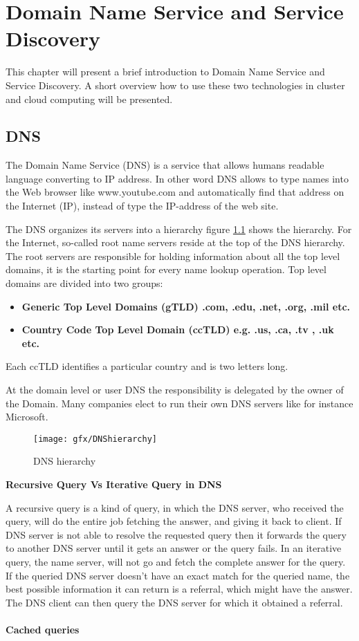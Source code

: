 \chapter{Domain Name Service and Service Discovery}\label{ch:dns}
This chapter will present a brief introduction to Domain Name Service and Service Discovery. A short overview how to use these two technologies in cluster and cloud computing will be presented.
	
\section{DNS}
The Domain Name Service (DNS) is a service that allows humans readable language converting to IP address. In other word DNS allows to type names into the Web browser like www.youtube.com and automatically find that address on the Internet (IP), instead of type the IP-address of the web site.

The DNS organizes its servers into a hierarchy figure \ref{fig:DNShierarchy} shows the hierarchy. For the Internet, so-called root name servers reside at the top of the DNS hierarchy. The root servers are responsible for holding information about all the top level domains, it is the starting point for every name lookup operation. Top level domains are divided into two groups:

\begin{itemize}
	\item \textbf{Generic Top Level Domains (gTLD) .com, .edu, .net, .org, .mil etc.}
	\item \textbf{ Country Code Top Level Domain (ccTLD) e.g. .us, .ca, .tv , .uk etc.}
\end{itemize}
Each ccTLD identifies a particular country and is two letters long.   


At the domain level or user DNS the responsibility is delegated by the owner of the Domain. Many companies elect to run their own DNS servers like for instance Microsoft. 
	

\begin{figure}[bth]
	\texttt{[image: gfx/DNShierarchy]}
	\caption[routingtable]{DNS hierarchy} \label{fig:DNShierarchy}
\end{figure}

\textbf{Recursive Query Vs Iterative Query in DNS}

A recursive query is a kind of query, in which the DNS server, who received the query, will do the entire job fetching the answer, and giving it back to client. If DNS server is not able to resolve the requested query then it forwards the query to another DNS server until it gets an answer or the query fails.
In an iterative query, the name server, will not go and fetch the complete answer for the query. If the queried DNS server doesn't have an exact match for the queried name, the best possible information it can return is a referral, which might have the answer. The DNS client can then query the DNS server for which it obtained a referral.
\\\\
\textbf{Cached queries}

